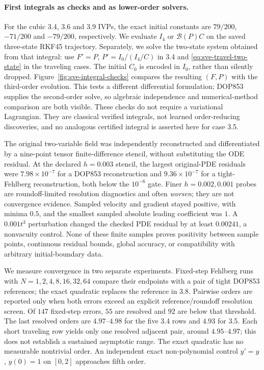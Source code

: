 \documentclass[11pt]{article}
\theoremstyle{definition}
\begin{document}
\paragraph{First integrals as checks and as lower-order solvers.}
For the cubic 3.4, 3.6 and 3.9 IVPs, the exact initial constants are
$79/200$, $-71/200$ and $-79/200$, respectively. We evaluate
$I_4$ or $\mathcal B(P)C$ on the saved three-state RKF45 trajectory. Separately,
we solve the two-state system obtained from that integral: use
$F'=P$, $P'=I_0/(I_4/C)$ in 3.4 and
\eqref{eq:sve-travel-two-state} in the traveling cases.
The initial $C_0$ is encoded in $I_0$, rather than silently dropped.
Figure~\ref{fig:sve-integral-checks} compares the resulting $(F,P)$ with the
third-order evolution. This tests a different differential formulation;
DOP853 supplies the second-order solve, so algebraic independence and
numerical-method comparison are both visible. These checks do not require
a variational Lagrangian. They are classical verified integrals, not learned
order-reducing discoveries, and no analogous certified integral is asserted
here for case 3.5.



The original two-variable field was independently reconstructed and
differentiated by a nine-point tensor finite-difference stencil, without
substituting the ODE residual. At the declared $h=0.003$ stencil, the
largest original-PDE residuals were $7.98\times10^{-7}$ for a DOP853
reconstruction and $9.36\times10^{-7}$ for a tight-Fehlberg reconstruction,
both below the $10^{-6}$ gate. Finer $h=0.002,0.001$ probes are
roundoff-limited resolution diagnostics and often \emph{worsen}; they are
not convergence evidence. Sampled velocity and gradient stayed positive,
with minima $0.5$, and the smallest sampled absolute leading coefficient
was $1$. A $0.001t^3$ perturbation changed the checked PDE residual by at
least $0.00241$, a nonvacuity control. None of these finite samples proves
positivity between sample points, continuous residual bounds, global
accuracy, or compatibility with arbitrary initial-boundary data.

We measure convergence in two separate experiments.
Fixed-step Fehlberg runs with $N=1,2,4,8,16,32,64$ compare their endpoints
with a pair of tight DOP853 references; the exact quadratic replaces the
reference in 3.8. Pairwise orders are reported only when both errors exceed
an explicit reference/roundoff resolution screen. Of $147$ fixed-step errors,
$55$ are resolved and $92$ are below that threshold. The last resolved orders
are $4.97$--$4.98$ for the five 3.4 rows and $4.93$ for 3.5. Each short
traveling row yields only one resolved adjacent pair, around $4.95$--$4.97$;
this does not establish a sustained asymptotic range. The exact quadratic
has no measurable nontrivial order. An independent exact non-polynomial
control $y'=y$, $y(0)=1$ on $[0,2]$ approaches fifth order.
\end{document}
